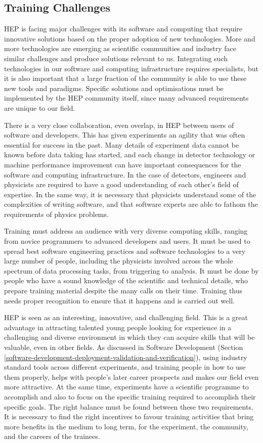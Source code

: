 \subsection{Training Challenges}

HEP is facing major challenges with its software and computing that
require innovative solutions based on the proper adoption of new
technologies. More and more technologies are emerging as scientific
communities and industry face similar challenges and produce solutions
relevant to us. Integrating such technologies in our software and
computing infrastructure requires specialists, but it is also important that a
large fraction of the community is able to use these new tools and
paradigms. Specific solutions and optimisations must be implemented by
the HEP community itself, since many advanced requirements are unique to
our field.

There is a very close collaboration, even overlap,
in HEP between users of software and developers. This has given experiments
an agility that was often essential for success in the past.
Many details of experiment data
cannot be known before data taking has started, and each change in
detector technology or machine performance improvement can have
important consequences for the software and computing infrastructure. In
the case of detectors, engineers and physicists are required to have a
good understanding of each other's field of expertise. In the same way,
it is necessary that physicists understand some of the complexities of
writing software, and that software experts are able to fathom the
requirements of physics problems.

Training must address an audience with very diverse computing skills,
ranging from novice programmers to advanced developers and users.
It must be used to spread best software engineering practices and
software technologies to a very large number of people, including the
physicists involved across the whole spectrum of data processing tasks,
from triggering to analysis. It must be done by people who have a sound
knowledge of the scientific and technical details, who prepare training
material despite the many calls on their time. Training thus needs
proper recognition to ensure that it happens and is carried out well.

HEP is seen as an interesting, innovative, and challenging field.
This is a great advantage in attracting talented young people looking
for experience in a challenging and diverse environment in which
they can acquire skills that will be valuable, even in other fields.
As discussed in Software Development (Section
\ref{software-development-deployment-validation-and-verification}),
using industry standard tools across different experiments,
and training people in how to use them properly,
helps with people's later career prospects
and makes our field even more attractive.
At the same time, experiments have a scientific programme to accomplish
and also to focus on the specific training required to
accomplish their specific goals. The right balance must be found between
these two requirements. It is necessary to find the right incentives to
favour training activities that bring more benefits in the medium to
long term, for the experiment, the community, and the careers of the
trainees.

